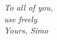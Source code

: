 \thispagestyle{empty}
\begin{center}
\vspace*{40mm}

\Large{\emph{To all of you,\\
use freely}}\\

\vspace*{30mm} \Large{\emph{Yours, Simo}}\\


\end{center}

\pagebreak
